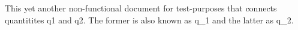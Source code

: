 
This yet another non-functional document for test-purposes that connects quantitites q1 and q2.
The former is also known as q_1 and the latter as q_2.
